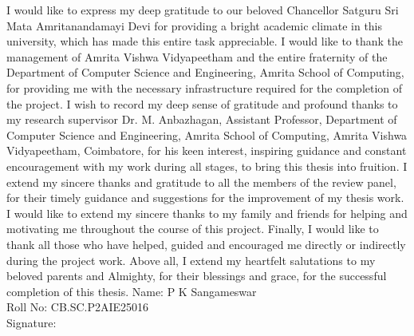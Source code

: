 \documentclass[MTech]{ugthesis}
\begin{document}
\maketitle
\certificate
\acknowledgements
\normalfont
I would like to express my deep gratitude to our beloved Chancellor Satguru Sri Mata Amritanandamayi Devi for providing a bright academic climate in this university, which has made this entire task appreciable. I would like to thank the management of Amrita Vishwa Vidyapeetham and the entire fraternity of the Department of Computer Science and Engineering, Amrita School of Computing, for providing me with the necessary infrastructure required for the completion of the project.
I wish to record my deep sense of gratitude and profound thanks to my research supervisor Dr. M. Anbazhagan, Assistant Professor, Department of Computer Science and Engineering, Amrita School of Computing, Amrita Vishwa Vidyapeetham, Coimbatore, for his keen interest, inspiring guidance and constant encouragement with my work during all stages, to bring this thesis into fruition.
I extend my sincere thanks and gratitude to all the members of the review panel, for their timely guidance and suggestions for the improvement of my thesis work.
I would like to extend my sincere thanks to my family and friends for helping and motivating me throughout the course of this project.
Finally, I would like to thank all those who have helped, guided and encouraged me directly or indirectly during the project work.
Above all, I extend my heartfelt salutations to my beloved parents and Almighty, for their blessings and grace, for the successful completion of this thesis.
\vskip 25pt
\noindent
Name: P K Sangameswar\\
Roll No: CB.SC.P2AIE25016\\
Signature:\\
\end{document}
